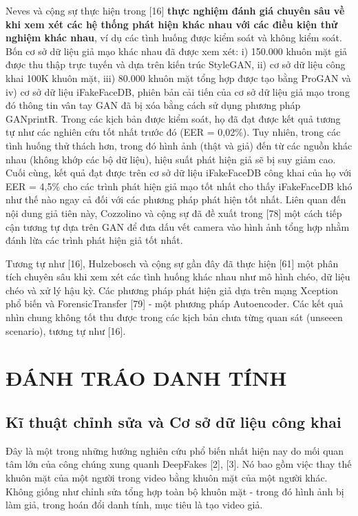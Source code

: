 \documentclass{article}
\begin{document}
Neves và cộng sự thực hiện trong [16] \textbf{thực nghiệm đánh giá chuyên sâu về khi xem xét các hệ thống phát hiện khác nhau với các điều kiện thử nghiệm khác nhau}, ví dụ các tình huống được kiểm soát và không kiểm soát. Bốn cơ sở dữ liệu giả mạo khác nhau đã được xem xét: i) 150.000 khuôn mặt giả được thu thập trực tuyến và dựa trên kiến trúc StyleGAN, ii) cơ sở dữ liệu công khai 100K khuôn mặt, iii) 80.000 khuôn mặt tổng hợp được tạo bằng ProGAN và iv) cơ sở dữ liệu iFakeFaceDB, phiên bản cải tiến của cơ sở dữ liệu giả mạo trong đó thông tin vân tay GAN đã bị xóa bằng cách sử dụng phương pháp GANprintR. Trong các kịch bản được kiểm soát, họ đã đạt được kết quả tương tự như các nghiên cứu tốt nhất trước đó (EER = 0,02\%). Tuy nhiên, trong các tình huống thử thách hơn, trong đó hình ảnh (thật và giả) đến từ các nguồn khác nhau (không khớp các bộ dữ liệu), hiệu suất phát hiện giả sẽ bị suy giảm cao. Cuối cùng, kết quả đạt được trên cơ sở dữ liệu iFakeFaceDB công khai của họ với EER = 4,5\% cho các trình phát hiện giả mạo tốt nhất cho thấy iFakeFaceDB khó như thế nào ngay cả đối với các phương pháp phát hiện tốt nhất. Liên quan đến nội dung giả tiên này, Cozzolino và cộng sự đã đề xuất trong [78] một cách tiếp cận tương tự dựa trên GAN để đưa dấu vết camera vào hình ảnh tổng hợp nhằm đánh lừa các trình phát hiện giả tốt nhất.

Tương tự như [16], Hulzebosch và cộng sự gần đây đã thực hiện [61] một phân tích chuyên sâu khi xem xét các tình huống khác nhau như mô hình chéo, dữ liệu chéo và xử lý hậu kỳ. Các phương pháp phát hiện giả dựa trên mạng Xception phổ biến và ForensicTransfer [79] - một phương pháp Autoencoder. Các kết quả nhìn chung không tốt thu được trong các kịch bản chưa từng quan sát (unseeen scenario), tương tự như [16].

\section{ĐÁNH TRÁO DANH TÍNH}

\subsection{Kĩ thuật chỉnh sửa và Cơ sở dữ liệu công khai}

Đây là một trong những hướng nghiên cứu phổ biến nhất hiện nay do mối quan tâm lớn của công chúng xung quanh DeepFakes [2], [3]. Nó bao gồm việc thay thế khuôn mặt của một người trong video bằng khuôn mặt của một người khác. Không giống như chỉnh sửa tổng hợp toàn bộ khuôn mặt - trong đó hình ảnh bị làm giả, trong hoán đổi danh tính, mục tiêu là tạo video giả.
\end{document}
